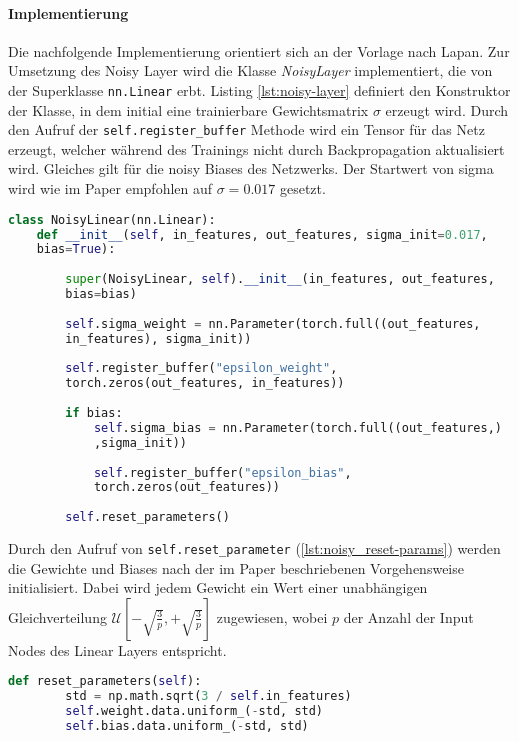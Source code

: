 \documentclass[11pt]{scrartcl}
\begin{document}
\paragraph*{Implementierung}
\noindent
\newline
Die nachfolgende Implementierung orientiert sich an der Vorlage nach Lapan\cite[~S.179]{L2018}.
Zur Umsetzung des Noisy Layer wird die Klasse \textit{NoisyLayer} implementiert, die von der
Superklasse \lstinline!nn.Linear! erbt. Listing \ref{lst:noisy-layer} definiert den Konstruktor
der Klasse, in dem initial eine trainierbare Gewichtsmatrix $\sigma$ erzeugt wird. Durch den
Aufruf der \lstinline!self.register_buffer! Methode wird ein Tensor für das Netz erzeugt, welcher
während des Trainings nicht durch Backpropagation aktualisiert wird. Gleiches gilt für die noisy
Biases des Netzwerks. Der Startwert von sigma wird wie im Paper empfohlen \cite[~S.6]{FAPMOGM2017}
auf $\sigma=0.017$ gesetzt.

\begin{lstlisting}[language=Python, caption=Konstruktor Noisy Layer, label=lst:noisy-layer]
class NoisyLinear(nn.Linear):
	def __init__(self, in_features, out_features, sigma_init=0.017, 
	bias=True):
		
		super(NoisyLinear, self).__init__(in_features, out_features,
		bias=bias)
		
		self.sigma_weight = nn.Parameter(torch.full((out_features,
		in_features), sigma_init))
		
		self.register_buffer("epsilon_weight", 
		torch.zeros(out_features, in_features))
		
		if bias:
    		self.sigma_bias = nn.Parameter(torch.full((out_features,)
    		,sigma_init))
    		
    		self.register_buffer("epsilon_bias", 
    		torch.zeros(out_features))
    		
		self.reset_parameters()
\end{lstlisting}

Durch den Aufruf von \lstinline!self.reset_parameter! (\ref{lst:noisy_reset-params}) werden die
Gewichte und Biases nach der im Paper beschriebenen Vorgehensweise initialisiert. Dabei wird
jedem Gewicht ein Wert einer unabhängigen Gleichverteilung
$\mathcal{U}[-\sqrt{\frac{3}{p}},+\sqrt{\frac{3}{p}}]$ zugewiesen, wobei $p$ der Anzahl der
Input Nodes des Linear Layers entspricht.
 
\begin{lstlisting}[language=Python, caption=Reinitialisierung der Gewichte und Biases, 
label=lst:noisy_reset-params]
	def reset_parameters(self):
		std = np.math.sqrt(3 / self.in_features)
		self.weight.data.uniform_(-std, std)
		self.bias.data.uniform_(-std, std)
\end{lstlisting}
\end{document}
